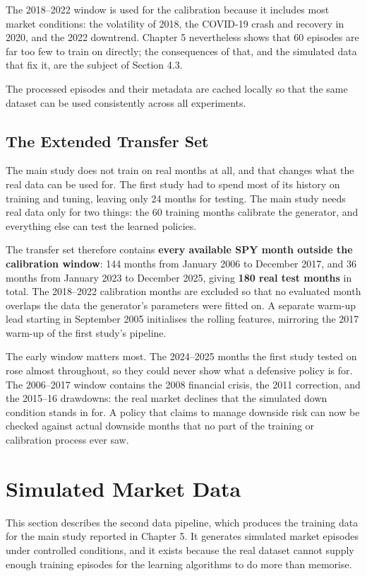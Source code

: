 The 2018--2022 window is used for the calibration because it includes most
market conditions: the volatility of 2018, the COVID-19 crash and
recovery in 2020, and the 2022 downtrend. Chapter 5 nevertheless shows
that 60 episodes are far too few to train on directly; the consequences
of that, and the simulated data that fix it, are the subject of
Section 4.3.

The processed episodes and their metadata are cached locally so that the
same dataset can be used consistently across all experiments.

\subsection{The Extended Transfer Set}

The main study does not train on real months at all, and that changes
what the real data can be used for. The first study had to spend most of its
history on training and tuning, leaving only 24 months for testing. The
main study needs real data only for two things: the 60 training months
calibrate the generator, and everything else can test the learned
policies.

The transfer set therefore contains \textbf{every available SPY month
outside the calibration window}: 144 months from January 2006 to
December 2017, and 36 months from January 2023 to December 2025, giving
\textbf{180 real test months} in total. The 2018--2022 calibration
months are excluded so that no evaluated month overlaps the data the
generator's parameters were fitted on. A separate warm-up lead starting
in September 2005 initialises the rolling features, mirroring the 2017
warm-up of the first study's pipeline.

The early window matters most. The 2024--2025 months the first study tested on
rose almost throughout, so they could never show what a defensive policy
is for. The 2006--2017 window contains the 2008 financial crisis, the
2011 correction, and the 2015--16 drawdowns: the real market declines
that the simulated down condition stands in for. A policy that claims to
manage downside risk can now be checked against actual downside months
that no part of the training or calibration process ever saw.

\section{Simulated Market Data}

This section describes the second data pipeline, which produces the
training data for the main study reported in Chapter 5. It generates
simulated market episodes under controlled conditions, and it exists
because the real dataset cannot supply enough training episodes for the
learning algorithms to do more than memorise.

